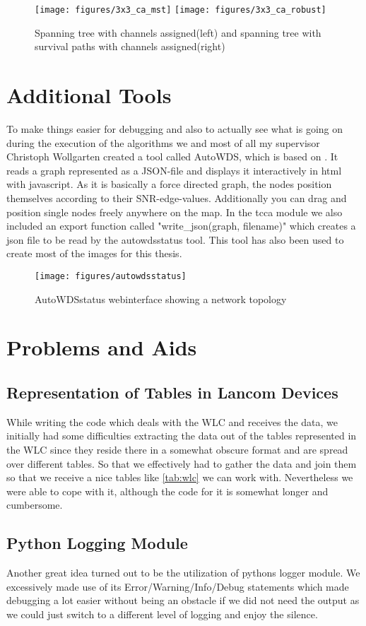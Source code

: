     \begin{figure}[t]
      \centering
      \texttt{[image: figures/3x3\_ca\_mst]}
      \texttt{[image: figures/3x3\_ca\_robust]}
      \caption{Spanning tree with channels assigned(left) and spanning tree with survival paths with channels assigned(right)}
      \label{fig:3x3third}
    \end{figure}
\section{Additional Tools}
  To make things easier for debugging and also to actually see what is going on during the execution of the algorithms we and most of all my supervisor Christoph
  Wollgarten created a tool called AutoWDS, which is based on \cite{d3js}. It reads a graph represented as a \ac{JSON}-file and displays it interactively in html with javascript.
  As it is basically a force directed graph, the nodes position themselves according to their SNR-edge-values. Additionally you can drag and position single nodes freely
  anywhere on the map.
  In the tcca module we also included an export function called "write\_json(graph, filename)" which creates a json file to be read by the autowdsstatus tool.
  This tool has also been used to create most of the images for this thesis.
  
  \begin{figure}[t]
    \centering
    \texttt{[image: figures/autowdsstatus]}
    \caption{AutoWDSstatus webinterface showing a network topology}
    \label{fig:autowdsstatus}
  \end{figure}
  
\section{Problems and Aids}
  \subsection{Representation of Tables in Lancom Devices}
    While writing the code which deals with the WLC and receives the data, we initially had some difficulties extracting the data out of the tables represented in the WLC since
    they reside there in a somewhat obscure format and are spread over different tables. So that we effectively had to gather the data and join them so that we receive a
    nice tables like \ref{tab:wlc} we can work with. Nevertheless we were able to cope with it, although the code for it is somewhat longer and cumbersome.

  \subsection{Python Logging Module}
    Another great idea turned out to be the utilization of pythons logger module. We excessively made use of its Error/Warning/Info/Debug statements which made debugging
    a lot easier without being an obstacle if we did not need the output as we could just switch to a different level of logging and enjoy the silence.
  
